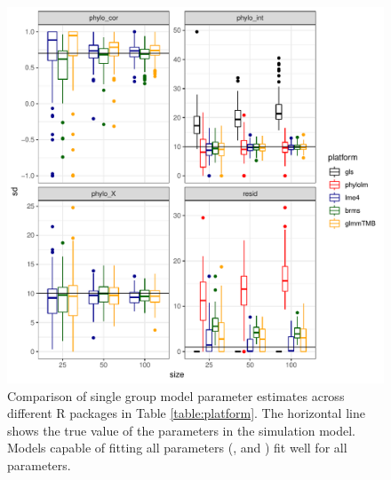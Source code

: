 \documentclass[12pt]{article}
\begin{document}
\begin{center}
\begin{figure}[H]
  \includegraphics[scale=0.8,page=1]{./git_push/plot.Rout.pdf}
  \caption{Comparison of single group model parameter estimates across different R packages in Table \ref{table:platform}. The horizontal line shows the true value of the parameters in the simulation model. Models capable of fitting all parameters (,  and ) fit well for all parameters.} 
\label{ssplot}
\end{figure}
\end{center}
\end{document}
